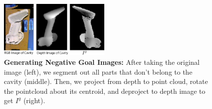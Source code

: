 \begin{figure}
  \centering
  \includegraphics[width=0.48\textwidth]{figures/Rotated_Negative.png}
  \caption{\textbf{Generating Negative Goal Images: }After taking the original image (left), we segment out all parts that don't belong to the cavity (middle). Then, we project from depth to point cloud, rotate the pointcloud about its centroid, and deproject to depth image to get $I^g$ (right).}
  \label{fig:rotated-cavity}
\end{figure}
